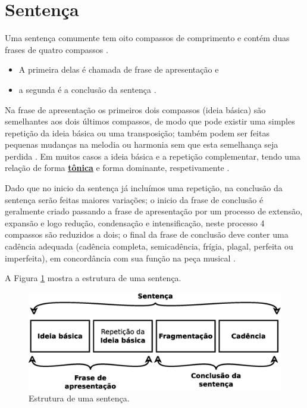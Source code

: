 \newpage
\section{Sentença}
\label{sec:sentence}
Uma sentença comumente tem oito compassos de comprimento e 
contém duas frases de quatro compassos \cite[pp. 48]{schoenberg1990fundamentos} \cite[pp. 21]{schoenberg1967fundamentals}.

\begin{itemize}
\item A primeira delas é chamada de frase de apresentação  e 
\item a segunda é a conclusão da sentença  \cite[pp. 58]{schoenberg1990fundamentos} \cite[pp. 58]{schoenberg1967fundamentals}.

\end{itemize}

Na frase de apresentação os primeiros dois compassos (ideia básica) são semelhantes aos dois últimos compassos,
de modo que pode existir uma simples repetição da ideia básica ou uma transposição;
também podem ser feitas pequenas mudanças na melodia ou harmonia sem que esta semelhança seja perdida \cite[pp. 48]{schoenberg1990fundamentos} \cite[pp. 21]{schoenberg1967fundamentals}.
Em muitos casos a ideia básica e a repetição complementar, tendo uma relação de
forma \hyperref[sec:Tonica]{\textbf{tônica}} e forma dominante, 
respetivamente \cite[pp. 49]{schoenberg1990fundamentos} \cite[pp. 21]{schoenberg1967fundamentals}.

Dado que no inicio da sentença já incluímos uma repetição,
na conclusão da sentença serão feitas maiores variações;
o inicio da frase de conclusão é geralmente criado passando a frase de apresentação
por um processo de extensão, expansão e logo redução, condensação e intensificação, 
neste processo 4 compassos são reduzidos a dois;
o final da frase de conclusão deve conter uma cadência adequada 
(cadência completa, semicadência, frígia, plagal, perfeita ou imperfeita),
em concordância com sua função na peça musical
\cite[pp. 59-59]{schoenberg1990fundamentos} \cite[pp. 58-59]{schoenberg1967fundamentals}.

A Figura \ref{fig:sentencestruct} mostra a estrutura de uma sentença. 
\begin{figure}[!h]
  \centering
    \includegraphics[width=\textwidth]{chapters/cap-musica-composer/sentencia.eps}
\caption{Estrutura de uma sentença.}
\label{fig:sentencestruct}
\end{figure}





